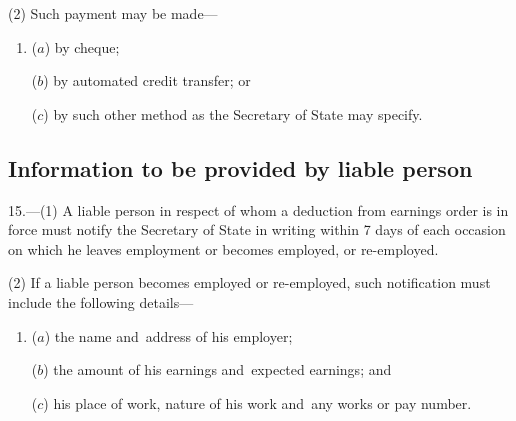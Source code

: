 \documentclass[12pt,a4paper]{article}
\begin{document}
(2) Such payment may be made—
\begin{enumerate}\item[]
($a$) by cheque;

($b$) by automated credit transfer; or

($c$) by such other method as the Secretary of State may specify.
\end{enumerate}

\subsection[15. Information to be provided by liable person]{Information to be provided by liable person}

%
%
%

15.---(1)  A liable person in respect of whom a deduction from earnings order is in force must notify the Secretary of State in writing within 7 days of each occasion on which he leaves employment or becomes employed, or re-employed.

(2) If a liable person becomes employed or re-employed, such notification must include the following details—
\begin{enumerate}\item[]
($a$) the name and~address of his employer;

($b$) the amount of his earnings and~expected earnings; and

($c$) his place of work, nature of his work and~any works or pay number.
\end{enumerate}

\end{document}
